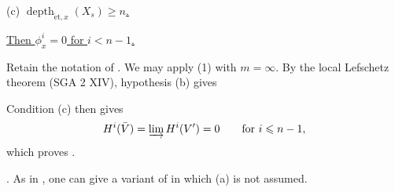 (c) \underline{$\operatorname{depth}_{\mathrm{\acute{e}t},x}(X_s)
\geqslant n$.}

\underline{Then $\phi^i_x=0$ for $i<n-1$.}

Retain the notation of . We may apply  (1) with $m=\infty$.
By the local Lefschetz theorem (SGA 2 XIV), hypothesis (b) gives
\begin{center}
\end{center}
Condition (c) then gives
\[
H^i(\bar V)=\varinjlim H^i(V')=0
\qquad\text{for }i\leqslant n-1,
\]
which proves .

. As in , one can give a variant of  in which (a) is not
assumed.

